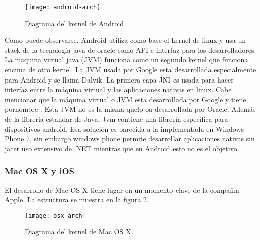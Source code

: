 \begin{figure}[H]
  \centering
  \texttt{[image: android-arch]}
  \caption{Diagrama del kernel de Android}
  \label{fig:android-kernel}
\end{figure}


Como puede observarse. Android utiliza como base el kernel de linux y usa un
stack de la tecnología java de oracle como API e interfaz para los
desarrolladores. La maquina virtual java (JVM) funciona como un segundo kernel
que funciona encima de otro kernel. La JVM usada por Google esta desarrollada
especialmente para Android y se llama Dalvik. La primera capa JNI es usada para
hacer interfaz entre la máquina virtual y las aplicaciones nativas en
linux. Cabe mencionar que la máquina virtual o JVM esta desarrollada por Google
y tiene pornombre . Esta JVM no es la misma quelp oa desarrollada por
Oracle. Además de la libreria estandar de Java, Jvm contiene una librería
específica para dispositivos android. Esa solución es parecida a la
implementada en Windows Phone 7, sin embargo windows phone permite desarrollar
aplicaciones nativas sin jacer uso extensivo de .NET mientras que en Android
esto no es el objetivo.

\subsubsection{Mac OS X y iOS} El desarrollo de Mac OS X tiene lugar en un
momento clave de la compañía Apple. La estructura se muestra en la figura
\ref{fig:macosx-kernel}.

\begin{figure}[H]
  \centering
  \texttt{[image: osx-arch]}
  \caption{Diagrama del kernel de Mac OS X}
  \label{fig:macosx-kernel}
\end{figure}

